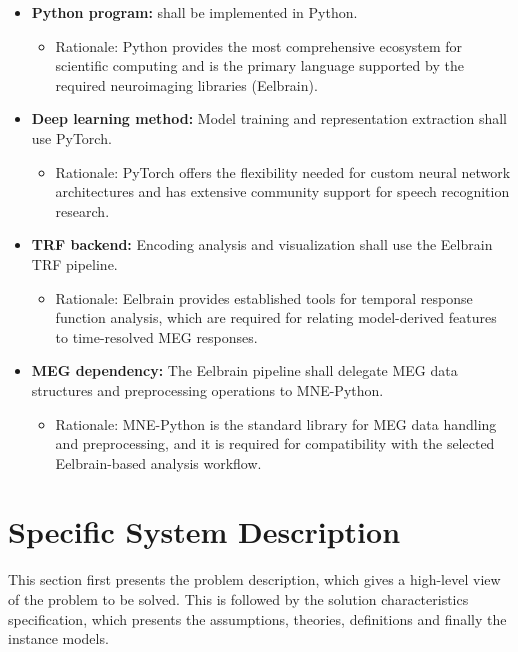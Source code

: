 \documentclass[12pt]{article}
\begin{document}
\begin{itemize}
  \item \textbf{Python program:} \progname{} shall be implemented in Python.
  \begin{itemize}
  \item Rationale: Python provides the most comprehensive ecosystem for scientific computing and is the primary language supported by the required neuroimaging libraries (Eelbrain).
  \end{itemize}
  
  \item \textbf{Deep learning method:} Model training and representation extraction shall use PyTorch.
  \begin{itemize}
  \item Rationale: PyTorch offers the flexibility needed for custom neural network architectures and has extensive community support for speech recognition research.
  \end{itemize}
  
  \item \textbf{TRF backend:} Encoding analysis and visualization shall use the Eelbrain TRF pipeline.
  \begin{itemize}
    \item Rationale: Eelbrain provides established tools for temporal response function analysis, which are required for relating model-derived features to time-resolved MEG responses.
  \end{itemize}
  
  \item \textbf{MEG dependency:} The Eelbrain pipeline shall delegate MEG data structures and preprocessing operations to MNE-Python.
  \begin{itemize}
    \item Rationale: MNE-Python is the standard library for MEG data handling and preprocessing, and it is required for compatibility with the selected Eelbrain-based analysis workflow.
  \end{itemize}

\end{itemize}





\section{Specific System Description}

This section first presents the problem description, which gives a high-level
view of the problem to be solved.  This is followed by the solution characteristics
specification, which presents the assumptions, theories, definitions and finally
the instance models.  
\end{document}
